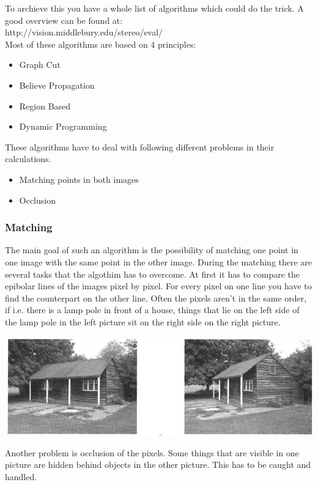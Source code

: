 \documentclass[12pt,draft,a4paper]{article}
\begin{document}
To archieve this you have a whole list of algorithms which could do
the trick. A good overview can be found at: \\
http://vision.middlebury.edu/stereo/eval/ \\
Most of these algorithms are based on 4 principles: 

\begin{itemize}
\item Graph Cut
\item Believe Propagation
\item Region Based
\item Dynamic Programming
\end{itemize}

These algorithms have to deal with following different problems in their
calculations.

\begin{itemize}
    \item Matching points in both images
    \item Occlusion
\end{itemize}

\subsubsection{Matching}
The main goal of such an algorithm is the possibility of matching one
point in one image with the same point in the other image. During the
matching there are several tasks that the algothim has to overcome. At
first it has to compare the epibolar lines of the images pixel by
pixel. For every pixel on one line you have to find the counterpart on
the other line. Often the pixels aren't in the same order, if
i.e. there is a lamp pole in front of a house, things that lie on
the left side of the lamp pole in the left picture sit on the right
side on the right picture.

\includegraphics{matching_problems_direction}  

Another problem is occlusion of the pixels. Some things that are
visible in one picture are hidden behind objects in the other
picture. This has to be caught and handled.
\end{document}
